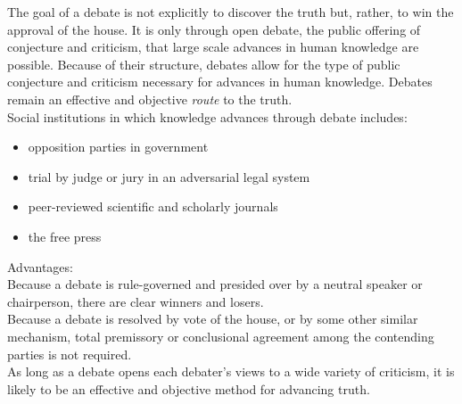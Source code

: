The goal of a debate is not explicitly to discover the truth but, rather, to win the approval of the house. It is only through open debate, the public offering of conjecture and criticism, that large scale advances in human knowledge are possible. Because of their structure, debates allow for the type of public conjecture and criticism necessary for advances in human knowledge. Debates remain an effective and objective \textit{route} to the truth.\\

Social institutions in which knowledge advances through debate includes:
\begin{itemize}
    \item opposition parties in government
    \item trial by judge or jury in an adversarial legal system
    \item peer-reviewed scientific and scholarly journals
    \item the free press
\end{itemize}
Advantages:\\
Because a debate is rule-governed and presided over by a neutral speaker or chairperson, there are clear winners and losers.\\
Because a debate is resolved by vote of the house, or by some other similar mechanism, total premissory or conclusional agreement among the contending parties is not required.\\
As long as a debate opens each debater's views to a wide variety of criticism, it is likely to be an effective and objective method for advancing truth.\\


